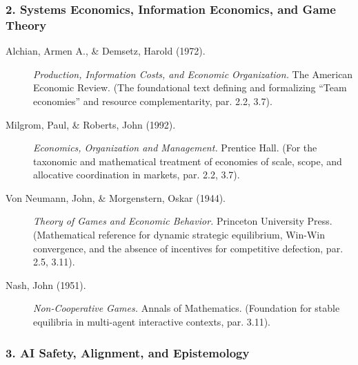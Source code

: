 \documentclass[11pt,a4paper,oneside]{article} %
\begin{document}
\hypertarget{systems-economics-information-economics-and-game-theory}{%
\subsubsection*{2. Systems Economics, Information Economics, and Game Theory}\label{systems-economics-information-economics-and-game-theory}}

\begin{description}
\item[Alchian, Armen A., \& Demsetz, Harold (1972).] \emph{Production, Information Costs, and Economic Organization.} The American Economic Review. (The foundational text defining and formalizing ``Team economies'' and resource complementarity, par. 2.2, 3.7).

\item[Milgrom, Paul, \& Roberts, John (1992).] \emph{Economics, Organization and Management.} Prentice Hall. (For the taxonomic and mathematical treatment of economies of scale, scope, and allocative coordination in markets, par. 2.2, 3.7).

\item[Von Neumann, John, \& Morgenstern, Oskar (1944).] \emph{Theory of Games and Economic Behavior.} Princeton University Press. (Mathematical reference for dynamic strategic equilibrium, Win-Win convergence, and the absence of incentives for competitive defection, par. 2.5, 3.11).

\item[Nash, John (1951).] \emph{Non-Cooperative Games.} Annals of Mathematics. (Foundation for stable equilibria in multi-agent interactive contexts, par. 3.11).
\end{description}

\hypertarget{ai-safety-alignment-and-epistemology}{%
\subsubsection*{3. AI Safety, Alignment, and Epistemology}\label{ai-safety-alignment-and-epistemology}}
\end{document}
